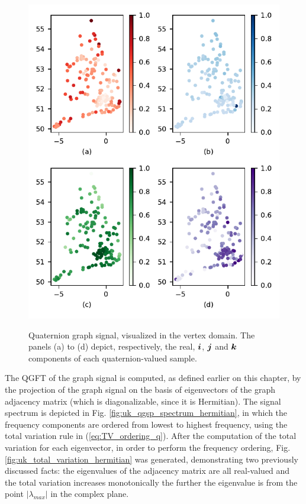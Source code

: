\begin{figure}
    \centering
    \caption{Quaternion graph signal, visualized in the vertex domain. The panels (a) to (d) depict, respectively, the real, $\boldsymbol{i}$, $\boldsymbol{j}$ and $\boldsymbol{k}$ components of each quaternion-valued sample.}
    \includegraphics[width=0.55\linewidth]{Figures/uk_signal.pdf}
    \floatsource
    \label{fig:uk_qgsp_graphsig}
\end{figure}

The QGFT of the graph signal is computed, as defined earlier on this chapter, by the projection of the graph signal on the basis of eigenvectors of the graph adjacency matrix (which is diagonalizable, since it is Hermitian). The signal spectrum is depicted in Fig. \ref{fig:uk_qgsp_spectrum_hermitian}, in which the frequency components are ordered from lowest to highest frequency, using the total variation rule in (\ref{eq:TV_ordering_q}). After the computation of the total variation for each eigenvector, in order to perform the frequency ordering, Fig. \ref{fig:uk_total_variation_hermitian} was generated, demonstrating two previously discussed facts: the eigenvalues of the adjacency matrix are all real-valued and the total variation increases monotonically the further the eigenvalue is from the point $|\lambda_{max}|$ in the complex plane.


